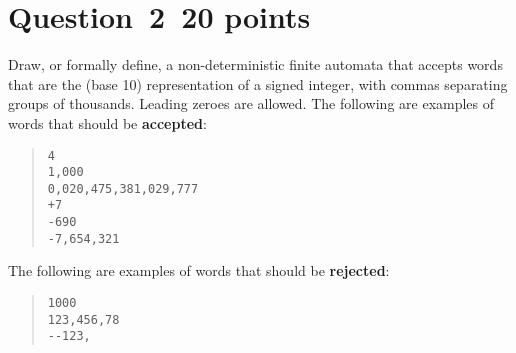\documentclass[10pt]{article}
\begin{document}
\section*{Question~2~\hfill 20 points}

Draw, or formally define,
a non-deterministic finite automata that accepts words that are
the (base 10) representation of a signed integer, with commas separating
groups of thousands.
Leading zeroes are allowed.
The following are examples of words that should be {\bf accepted}:
\begin{quote}
\begin{verbatim}
4
1,000
0,020,475,381,029,777
+7
-690
-7,654,321
\end{verbatim}
\end{quote}
The following are examples of words that should be {\bf rejected}:
\begin{quote}
\begin{verbatim}
1000
123,456,78
--123,
\end{verbatim}
\end{quote}
\end{document}
